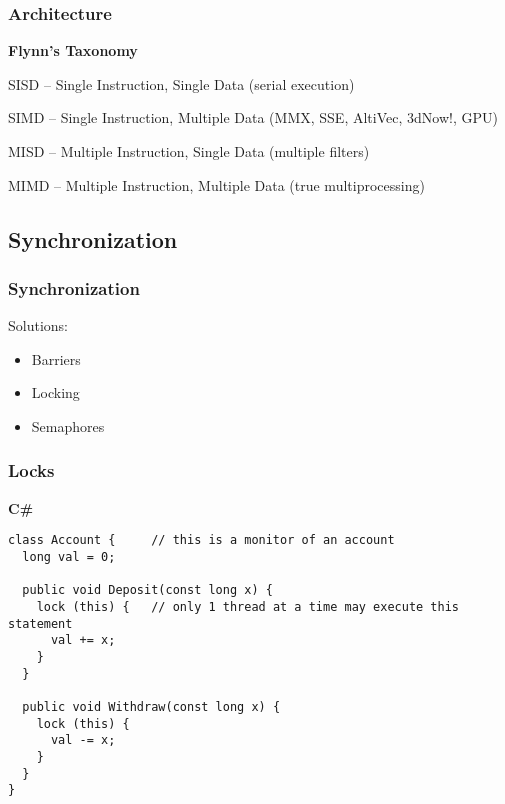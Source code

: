 \documentclass{beamer}
\begin{document}

\begin{frame}
\frametitle{Architecture}
\textbf{Flynn's Taxonomy}

SISD -- Single Instruction, Single Data
(serial execution)

SIMD -- Single Instruction, Multiple Data
(MMX, SSE, AltiVec, 3dNow!, GPU)

MISD -- Multiple Instruction, Single Data 
(multiple filters)

MIMD -- Multiple Instruction, Multiple Data
(true multiprocessing)
\end{frame}

\subsection{Synchronization}
\begin{frame}
\frametitle{Synchronization}

\pause
Solutions:
\begin{itemize}
  \item Barriers
  \item Locking
  \item Semaphores
\end{itemize}

\end{frame}


\begin{frame}[fragile]
\frametitle{Locks}
\textbf{C\#}
\begin{verbatim}
class Account {     // this is a monitor of an account
  long val = 0;
 
  public void Deposit(const long x) {
    lock (this) {   // only 1 thread at a time may execute this statement
      val += x;
    }
  }
 
  public void Withdraw(const long x) {
    lock (this) {
      val -= x;
    }
  }
}
\end{verbatim}
\end{frame}
\end{document}
